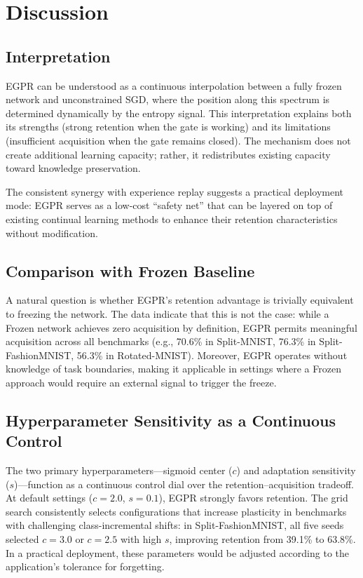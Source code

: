 \documentclass[11pt,a4paper]{article}
\begin{document}
\section{Discussion}

\subsection{Interpretation}

EGPR can be understood as a continuous interpolation between a fully frozen network and unconstrained SGD, where the position along this spectrum is determined dynamically by the entropy signal. This interpretation explains both its strengths (strong retention when the gate is working) and its limitations (insufficient acquisition when the gate remains closed). The mechanism does not create additional learning capacity; rather, it redistributes existing capacity toward knowledge preservation.

The consistent synergy with experience replay suggests a practical deployment mode: EGPR serves as a low-cost ``safety net'' that can be layered on top of existing continual learning methods to enhance their retention characteristics without modification.

\subsection{Comparison with Frozen Baseline}

A natural question is whether EGPR's retention advantage is trivially equivalent to freezing the network. The data indicate that this is not the case: while a Frozen network achieves zero acquisition by definition, EGPR permits meaningful acquisition across all benchmarks (e.g., 70.6\% in Split-MNIST, 76.3\% in Split-FashionMNIST, 56.3\% in Rotated-MNIST). Moreover, EGPR operates without knowledge of task boundaries, making it applicable in settings where a Frozen approach would require an external signal to trigger the freeze.

\subsection{Hyperparameter Sensitivity as a Continuous Control}

The two primary hyperparameters---sigmoid center ($c$) and adaptation sensitivity ($s$)---function as a continuous control dial over the retention--acquisition tradeoff. At default settings ($c = 2.0$, $s = 0.1$), EGPR strongly favors retention. The grid search consistently selects configurations that increase plasticity in benchmarks with challenging class-incremental shifts: in Split-FashionMNIST, all five seeds selected $c = 3.0$ or $c = 2.5$ with high $s$, improving retention from 39.1\% to 63.8\%. In a practical deployment, these parameters would be adjusted according to the application's tolerance for forgetting.
\end{document}
